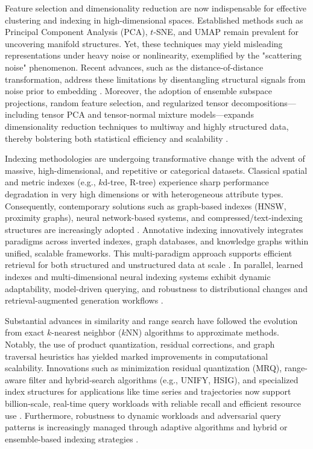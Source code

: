 \documentclass[11pt]{article}
\begin{document}
Feature selection and dimensionality reduction are now indispensable for effective clustering and indexing in high-dimensional spaces. Established methods such as Principal Component Analysis (PCA), $t$-SNE, and UMAP remain prevalent for uncovering manifold structures. Yet, these techniques may yield misleading representations under heavy noise or nonlinearity, exemplified by the "scattering noise" phenomenon. Recent advances, such as the distance-of-distance transformation, address these limitations by disentangling structural signals from noise prior to embedding \cite{ref112}. Moreover, the adoption of ensemble subspace projections, random feature selection, and regularized tensor decompositions—including tensor PCA and tensor-normal mixture models—expands dimensionality reduction techniques to multiway and highly structured data, thereby bolstering both statistical efficiency and scalability \cite{ref40,ref88,ref89,ref90}.

Indexing methodologies are undergoing transformative change with the advent of massive, high-dimensional, and repetitive or categorical datasets. Classical spatial and metric indexes (e.g., $k$d-tree, R-tree) experience sharp performance degradation in very high dimensions or with heterogeneous attribute types. Consequently, contemporary solutions such as graph-based indexes (HNSW, proximity graphs), neural network-based systems, and compressed/text-indexing structures are increasingly adopted \cite{ref11,ref23,ref34,ref63,ref70}. Annotative indexing innovatively integrates paradigms across inverted indexes, graph databases, and knowledge graphs within unified, scalable frameworks. This multi-paradigm approach supports efficient retrieval for both structured and unstructured data at scale \cite{ref69}. In parallel, learned indexes and multi-dimensional neural indexing systems exhibit dynamic adaptability, model-driven querying, and robustness to distributional changes and retrieval-augmented generation workflows \cite{ref64,ref65,ref66}.

Substantial advances in similarity and range search have followed the evolution from exact $k$-nearest neighbor ($k$NN) algorithms to approximate methods. Notably, the use of product quantization, residual corrections, and graph traversal heuristics has yielded marked improvements in computational scalability. Innovations such as minimization residual quantization (MRQ), range-aware filter and hybrid-search algorithms (e.g., UNIFY, HSIG), and specialized index structures for applications like time series and trajectories now support billion-scale, real-time query workloads with reliable recall and efficient resource use \cite{ref7,ref12,ref17,ref18,ref22,ref54,ref56,ref61,ref75,ref67,ref70}. Furthermore, robustness to dynamic workloads and adversarial query patterns is increasingly managed through adaptive algorithms and hybrid or ensemble-based indexing strategies \cite{ref53,ref62,ref92}.
\end{document}
